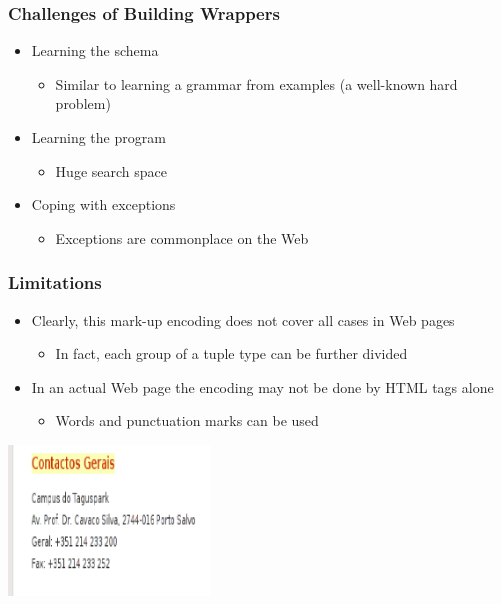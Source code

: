 \documentclass[svgnames]{beamer}
\begin{document}

\begin{frame}
    \frametitle{Challenges of Building Wrappers}
    
    \begin{itemize}
    \item Learning the schema
        \begin{itemize}
        \item Similar to learning a grammar from examples (a well-known hard
            problem)
        \end{itemize}
    \item Learning the program
        \begin{itemize}
        \item Huge search space
        \end{itemize}
    \item Coping with exceptions
        \begin{itemize}
        \item Exceptions are commonplace on the Web
        \end{itemize}
    \end{itemize}

\end{frame}

\begin{frame} \frametitle{Limitations}
  
  \begin{itemize}
  \item Clearly, this mark-up encoding does not cover all cases in Web pages
    \begin{itemize}
    \item In fact, each group of a tuple type can be further divided
    \end{itemize}
  \item In an actual Web page the encoding may not be done by HTML tags alone
    \begin{itemize}
    \item Words and punctuation marks can be used
    \end{itemize}
  \end{itemize}

  \centering
  \includegraphics[width=0.4\textwidth]{example4}

\end{frame}
\end{document}
